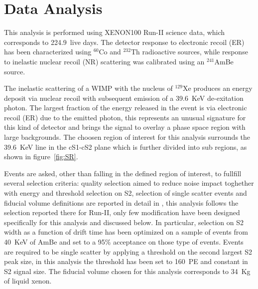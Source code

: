 \section{Data Analysis}

This analysis is performed using XENON100 Run-II science data, which corresponds to 224.9~live days. The detector response to
electronic recoil (ER) has been characterized using $^{60}$Co and $^{232}$Th radioactive sources, while response to inelastic nuclear recoil (NR)
scattering was calibrated using an $^{241}$AmBe source. 

The inelastic scattering of a WIMP with the nucleus of $^{129}$Xe produces an energy deposit via nuclear recoil with subsequent emission of  
a 39.6~KeV de-exitation photon. 
The largest fraction of the energy released in the event is via electronic recoil (ER) due to the emitted photon, this represents an
unusual signature for this kind of detector and brings the signal to overlay a phase space region with large backgrounds.
The choosen region of interest for this analysis surrounds the 39.6~KeV line in the cS1-cS2 plane which is further divided into
sub regions, as shown in figure~\ref{fig:SR}.

Events are asked, other than falling in the defined region of interest, to fullfill several selection criteria:
quality selection aimed to reduce noise impact toghether with energy and threshold selection on S2,
selection of single scatter events and fiducial volume definitions are reported in detail in \cite{dataAnalysis}, this analysis follows
the selection reported there for Run-II, only few modification have been designed specifically for this analysis and discussed below. 
In particular, selection on S2 width as a function of drift time has been optimized on a sample of events from 40~KeV of AmBe 
and set to a 95\% acceptance on those type of events. Events are required to be single scatter by applying a threshold on the 
second largest S2 peak size, in this analysis the threshold has been set to 160~PE and constant in S2 signal size. The fiducial
volume chosen for this analysis corresponds to 34~Kg of liquid xenon.



